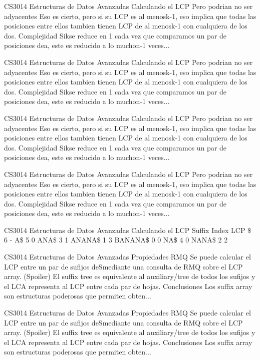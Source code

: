 \begin{description}[leftmargin=!,labelwidth=4.2em,style=nextline]
\item[Pag. 67] CS3014 Estructuras de Datos Avanzadas Calculando el LCP Pero podrian no ser adyacentes Eso es cierto, pero si su LCP es al menosk-1, eso implica que todas las posiciones entre ellos tambien tienen LCP de al menosk-1 con cualquiera de los dos. Complejidad Sikse reduce en 1 cada vez que comparamos un par de posiciones dea, este es reducido a lo muchon-1 veces...
\item[Pag. 68] CS3014 Estructuras de Datos Avanzadas Calculando el LCP Pero podrian no ser adyacentes Eso es cierto, pero si su LCP es al menosk-1, eso implica que todas las posiciones entre ellos tambien tienen LCP de al menosk-1 con cualquiera de los dos. Complejidad Sikse reduce en 1 cada vez que comparamos un par de posiciones dea, este es reducido a lo muchon-1 veces...
\item[Pag. 69] CS3014 Estructuras de Datos Avanzadas Calculando el LCP Pero podrian no ser adyacentes Eso es cierto, pero si su LCP es al menosk-1, eso implica que todas las posiciones entre ellos tambien tienen LCP de al menosk-1 con cualquiera de los dos. Complejidad Sikse reduce en 1 cada vez que comparamos un par de posiciones dea, este es reducido a lo muchon-1 veces...
\item[Pag. 70] CS3014 Estructuras de Datos Avanzadas Calculando el LCP Pero podrian no ser adyacentes Eso es cierto, pero si su LCP es al menosk-1, eso implica que todas las posiciones entre ellos tambien tienen LCP de al menosk-1 con cualquiera de los dos. Complejidad Sikse reduce en 1 cada vez que comparamos un par de posiciones dea, este es reducido a lo muchon-1 veces...
\item[Pag. 71] CS3014 Estructuras de Datos Avanzadas Calculando el LCP Suffix Index LCP \$ 6 - A\$ 5 0 ANA\$ 3 1 ANANA\$ 1 3 BANANA\$ 0 0 NA\$ 4 0 NANA\$ 2 2
\item[Pag. 72] CS3014 Estructuras de Datos Avanzadas Propiedades RMQ Se puede calcular el LCP entre un par de sufijos deSmediante una consulta de RMQ sobre el LCP array. (Spoiler) El suffix tree es equivalente al auxiliary/tree de todos los sufijos y el LCA representa al LCP entre cada par de hojas. Conclusiones Los suffix array son estructuras poderosas que permiten obten...
\item[Pag. 73] CS3014 Estructuras de Datos Avanzadas Propiedades RMQ Se puede calcular el LCP entre un par de sufijos deSmediante una consulta de RMQ sobre el LCP array. (Spoiler) El suffix tree es equivalente al auxiliary/tree de todos los sufijos y el LCA representa al LCP entre cada par de hojas. Conclusiones Los suffix array son estructuras poderosas que permiten obten...

\end{description}
